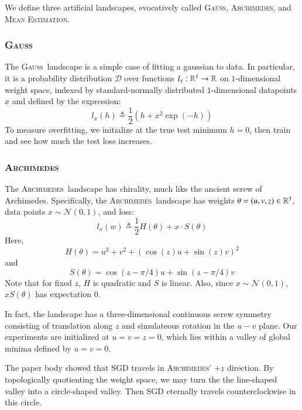 \documentclass{article}
\theoremstyle{plain}
\theoremstyle{definition}
\newcommand{\wrap}[1]{\left(#1\right)}
\newcommand{\Dd}{\mathcal{D}}
\newcommand{\Nn}{\mathcal{N}}   \newcommand{\NN}{\mathbb{N}}
\newcommand{\Gauss}{\textsc{Gauss}}
\newcommand{\Archimedes}{\textsc{Archimedes}}
\newcommand{\MeanEstimation}{\textsc{Mean Estimation}}
\begin{document}
        We define three artificial landscapes, evocatively called
        \Gauss, \Archimedes, and \MeanEstimation.

        \subsubsection*{\Gauss}
            The \Gauss\, landscape is a simple case of fitting a gaussian to
            data.  In particular, it is a probability distribution $\Dd$ over
            functions $l_x:\mathbb{R}^1\to \mathbb{R}$ on $1$-dimensional weight space,
            indexed by standard-normally distributed $1$-dimensional datapoints
            $x$ and defined by the expression:
            $$
                l_x(h)
                \triangleq
                \frac{1}{2} \wrap{h + x^2 \exp(-h)}
            $$
            To measure overfitting, we initialize at the true test minimum
            $h=0$, then train and see how much the test loss increases.
            
        \subsubsection*{\Archimedes}
            The \Archimedes\, landscape has chirality, much like the ancient
            screw of Archimedes.  
            Specifically, the \Archimedes\ landscape has
            weights     $\theta = (u,v,z) \in \mathbb{R}^3$,
            data points $x \sim \Nn(0, 1)$,
            and loss:
            $$
                l_x(w)
                \triangleq
                \frac{1}{2} H(\theta) + x \cdot S(\theta)
            $$
            Here, $$H(\theta) = u^2 + v^2 + (\cos(z) u + \sin(z) v)^2$$
            and   $$S(\theta) = \cos(z-\pi/4) u + \sin(z-\pi/4) v$$
            Note that for fixed $z$, $H$ is quadratic and $S$ is linear.  Also,
            since $x \sim \Nn(0,1)$, $x S(\theta)$ has expectation $0$.
 
            In fact, the landscape has a three-dimensional continuous screw
            symmetry consisting of translation along $z$ and simulateous
            rotation in the $u-v$ plane.  Our experiments are initialized at
            $u=v=z=0$, which lies within a valley of global minima defined by
            $u=v=0$.  

            The paper body showed that SGD travels in \Archimedes' $+z$
            direction.  By topologically quotienting the weight space, we may
            turn the the line-shaped valley into a circle-shaped valley.  Then
            SGD eternally travels counterclockwise in this circle.
           
\end{document}
